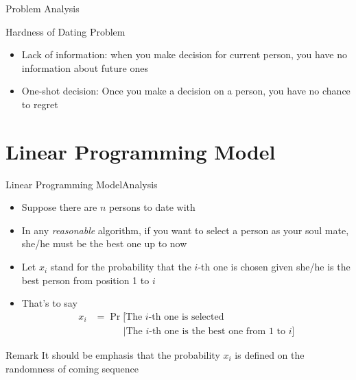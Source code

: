 \documentclass{beamer}
\begin{document}
\begin{frame}{Problem Analysis}
		\begin{block}{Hardness of Dating Problem}
  \begin{itemize}
  \item Lack of information: when you make decision for current person, you have no information about future ones
  \item One-shot decision: Once you make a decision on a person, you have no chance to regret
  \end{itemize}
  \end{block}
\end{frame}

\section{Linear Programming Model}

\begin{frame}{Linear Programming Model}{Analysis}
\begin{itemize}
  \item Suppose there are $n$ persons to date with
  \item In any \emph{reasonable} algorithm, if you want to select a person as your soul mate, she/he must be the best one up to now
  \item Let $x_i$ stand for the probability that the $i$-th one is chosen given she/he is the best person from position 1 to $i$ 
  \item That's to say
		  \begin{equation}
				  \begin{split}
				  x_i &= \Pr[\text{The $i$-th one is selected}\\
				  &\qquad\quad|\text{The $i$-th one is the best one from 1 to $i$}]
				  \end{split}
		  \end{equation}
\end{itemize}
\begin{block}{Remark}
		  It should be emphasis that the probability $x_i$ is defined on the randomness of coming sequence
\end{block}
\end{frame}
\end{document}
